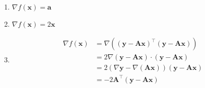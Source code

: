 \documentclass[11pt,letter,notitlepage]{article}
\begin{document}
\begin{solution}
	\begin{enumerate}
		\item $\nabla f(\mathbf{x}) = \mathbf{a}$
		\item $\nabla f(\mathbf{x}) = 2\mathbf{x}$
		\item $$\begin{aligned}
				      \nabla f(\mathbf{x})
				       & = \nabla \left( (\mathbf{y}-\mathbf{A}\mathbf{x})^\top(\mathbf{y}-\mathbf{A}\mathbf{x}) \right)      \\
				       & = 2\nabla (\mathbf{y}-\mathbf{A}\mathbf{x}) \cdot (\mathbf{y}-\mathbf{A}\mathbf{x})                  \\
				       & = 2\left( \nabla \mathbf{y}- \nabla (\mathbf{A}\mathbf{x}) \right) (\mathbf{y}-\mathbf{A}\mathbf{x}) \\
				       & = -2 \mathbf{A}^\top (\mathbf{y}-\mathbf{A}\mathbf{x})
			      \end{aligned}$$
		      $$$$
	\end{enumerate}
\end{solution}
\newpage
\end{document}
